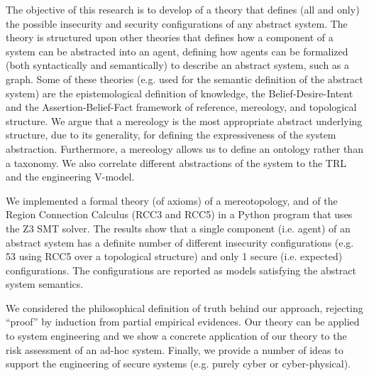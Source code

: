 The objective of this research is to develop of a theory that defines
(all and only) the possible insecurity and security configurations of
any abstract system. The theory is structured upon other theories that 
defines how a component of a system can be abstracted into an agent, defining how
agents can be formalized (both syntactically and semantically) to
describe an abstract system, such as a graph. Some of these theories
(e.g. used for the semantic
definition of the abstract system) are the epistemological definition
of knowledge, the Belief-Desire-Intent and the Assertion-Belief-Fact 
framework of reference, 
mereology, and topological structure. We argue that a mereology is the
most appropriate abstract underlying structure, due to its generality,
for defining the expressiveness of the system abstraction.  Furthermore, a
mereology allows us to define an ontology rather than a taxonomy.  We
also correlate different abstractions of the system to the TRL and the
engineering V-model. 

We implemented a formal theory (of axioms) of a mereotopology, and of
the Region Connection Calculus (RCC3 and RCC5) in a Python program that
uses the Z3 SMT solver. The results show that a single component (i.e.
agent) of an abstract system has a definite number of  different
insecurity configurations (e.g. 53 using RCC5 over a topological
structure) and only 1 secure (i.e. expected) configurations. The
configurations are reported as models satisfying the abstract system
semantics. 

We considered the philosophical definition of truth behind our
approach, rejecting ``proof'' by induction from partial empirical evidences.
Our theory can be applied to system engineering and we show a concrete
application of our theory to the risk assessment of an ad-hoc system.
Finally, we provide a number of ideas to support the engineering of
secure systems (e.g. purely cyber or cyber-physical).
